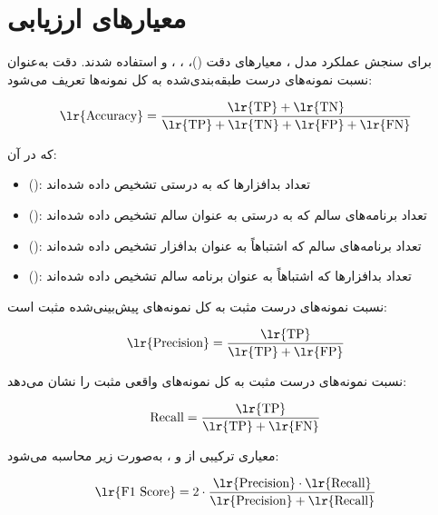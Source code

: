 \section{معیارهای ارزیابی}
برای سنجش عملکرد مدل ، معیارهای دقت ()، ، ،  و  استفاده شدند. دقت به‌عنوان نسبت نمونه‌های درست طبقه‌بندی‌شده به کل نمونه‌ها تعریف می‌شود:

\begin{equation}
\text{\lr{Accuracy}} = \frac{\text{\lr{TP}} + \text{\lr{TN}}}{\text{\lr{TP}} + \text{\lr{TN}} + \text{\lr{FP}} + \text{\lr{FN}}}
\end{equation}

که در آن:
\begin{itemize}
    \renewcommand{\labelitemi}{\lr{$\bullet$}}
    \item {} (): تعداد بدافزارها که به درستی تشخیص داده شده‌اند
    \item {} (): تعداد برنامه‌های سالم که به درستی به عنوان سالم تشخیص داده شده‌اند
    \item {} (): تعداد برنامه‌های سالم که اشتباهاً به عنوان بدافزار تشخیص داده شده‌اند
    \item {} (): تعداد بدافزارها که اشتباهاً به عنوان برنامه سالم تشخیص داده شده‌اند
\end{itemize}

 نسبت نمونه‌های درست مثبت به کل نمونه‌های پیش‌بینی‌شده مثبت است:

\begin{equation}
\text{\lr{Precision}} = \frac{\text{\lr{TP}}}{\text{\lr{TP}} + \text{\lr{FP}}}
\end{equation}

 نسبت نمونه‌های درست مثبت به کل نمونه‌های واقعی مثبت را نشان می‌دهد:

\begin{equation}
\text{Recall} = \frac{\text{\lr{TP}}}{\text{\lr{TP}} + \text{\lr{FN}}}
\end{equation}

 معیاری ترکیبی از  و ، به‌صورت زیر محاسبه می‌شود:

\begin{equation}
\text{\lr{F1 Score}} = 2 \cdot \frac{\text{\lr{Precision}} \cdot \text{\lr{Recall}}}{\text{\lr{Precision}} + \text{\lr{Recall}}}
\end{equation}

